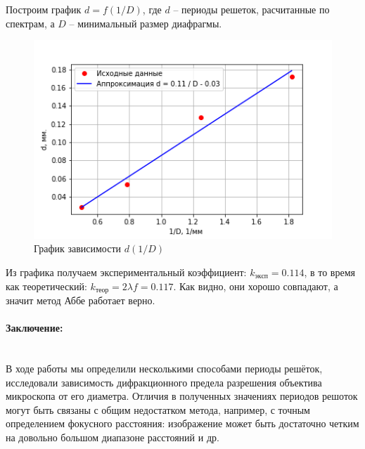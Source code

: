 \documentclass[a4paper, 12pt]{article}
\newcommand{\parag}[1]{\paragraph*{#1:}}
\begin{document}
Построим график $d = f(1 / D)$, где $d$ -- периоды решеток, расчитанные по спектрам, а $D$ -- минимальный размер диафрагмы.

\begin{figure}[h]
	\centering
	\includegraphics[width=0.8\linewidth]{abbe_graph.png}
	\caption{График зависимости $d(1/D)$}
	\label{fig:abbe_graph}
\end{figure}

Из графика получаем экспериментальный коэффициент: $k_{эксп} = 0.114$, в то время как теоретический: $k_{теор} = 2 \lambda f = 0.117$. Как видно, они хорошо совпадают, а значит метод Аббе работает верно.

\parag {Заключение} ~\\
В ходе работы мы определили несколькими способами периоды решёток, исследовали зависимость дифракционного предела разрешения объектива микроскопа от его диаметра. Отличия в полученных значениях периодов решоток могут быть связаны с общим недостатком метода, например, с точным определением фокусного расстояния: изображение может быть достаточно четким на довольно большом диапазоне расстояний и др.
\end{document}
